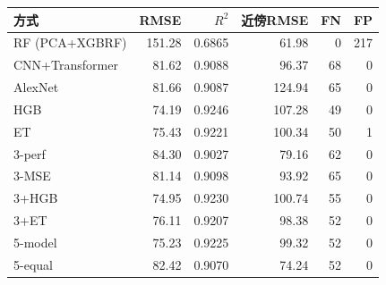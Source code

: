 \begin{tabular}{lrrrrr}
\toprule
方式 & RMSE & $R^2$ & 近傍RMSE & FN & FP \\
\midrule
RF (PCA+XGBRF) & 151.28 & 0.6865 & 61.98 & 0 & 217 \\
CNN+Transformer & 81.62 & 0.9088 & 96.37 & 68 & 0 \\
AlexNet & 81.66 & 0.9087 & 124.94 & 65 & 0 \\
HGB & 74.19 & 0.9246 & 107.28 & 49 & 0 \\
ET & 75.43 & 0.9221 & 100.34 & 50 & 1 \\
3-perf & 84.30 & 0.9027 & 79.16 & 62 & 0 \\
3-MSE & 81.14 & 0.9098 & 93.92 & 65 & 0 \\
3+HGB & 74.95 & 0.9230 & 100.74 & 55 & 0 \\
3+ET & 76.11 & 0.9207 & 98.38 & 52 & 0 \\
5-model & 75.23 & 0.9225 & 99.32 & 52 & 0 \\
5-equal & 82.42 & 0.9070 & 74.24 & 52 & 0 \\
\bottomrule
\end{tabular}

